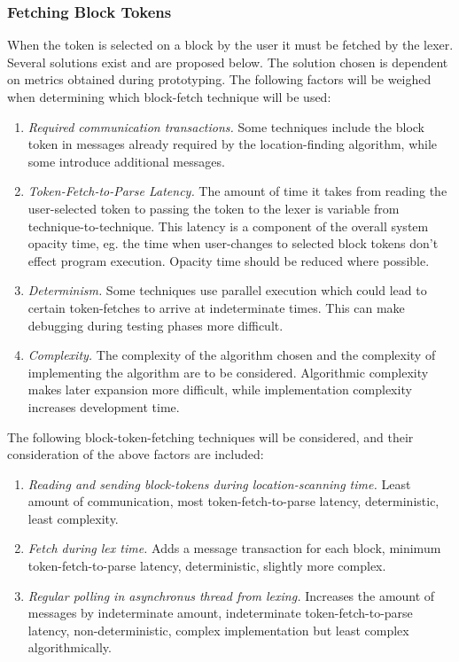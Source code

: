 \subsubsection{Fetching Block Tokens}
When the token is selected on a block by the user it must be fetched by the lexer. Several solutions exist and are proposed below. The solution chosen is dependent on metrics obtained during prototyping. The following factors will be weighed when determining which block-fetch technique will be used:
\begin{enumerate}
    \item \textit{Required communication transactions.} Some techniques include the block token in messages already required by the location-finding algorithm, while some introduce additional messages.
    \item \textit{Token-Fetch-to-Parse Latency.} The amount of time it takes from reading the user-selected token to passing the token to the lexer is variable from technique-to-technique. This latency is a component of the overall system opacity time, eg. the time when user-changes to selected block tokens don't effect program execution. Opacity time should be reduced where possible.
    \item \textit{Determinism.} Some techniques use parallel execution which could lead to certain token-fetches to arrive at indeterminate times. This can make debugging during testing phases more difficult.
    \item \textit{Complexity.} The complexity of the algorithm chosen and the complexity of implementing the algorithm are to be considered. Algorithmic complexity makes later expansion more difficult, while implementation complexity increases development time.
\end{enumerate}

The following block-token-fetching techniques will be considered, and their consideration of the above factors are included:
\begin{enumerate}
    \item \textit{Reading and sending block-tokens during location-scanning time.} Least amount of communication, most token-fetch-to-parse latency, deterministic, least complexity.
    \item \textit{Fetch during lex time.} Adds a message transaction for each block, minimum token-fetch-to-parse latency, deterministic, slightly more complex.
    \item \textit{Regular polling in asynchronus thread from lexing.} Increases the amount of messages by indeterminate amount, indeterminate token-fetch-to-parse latency, non-deterministic, complex implementation but least complex algorithmically.
\end{enumerate}

